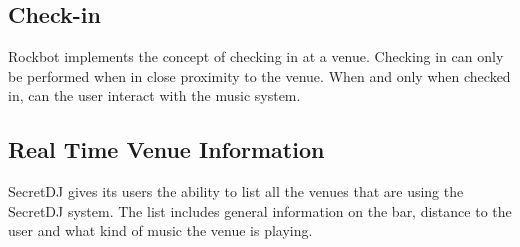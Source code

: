 \subsection{Check-in}
Rockbot implements the concept of checking in at a venue. Checking in
can only be performed when in close proximity to the venue. When and
only when checked in, can the user interact with the music system.

\subsection{Real Time Venue Information}
SecretDJ gives its users the ability to list all the venues that are
using the SecretDJ system. The list includes general information on
the bar, distance to the user and what kind of music the venue is
playing.
